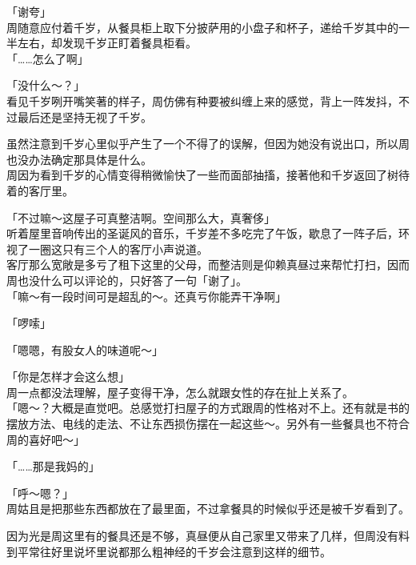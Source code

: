 「谢夸」\\

周随意应付着千岁，从餐具柜上取下分披萨用的小盘子和杯子，递给千岁其中的一半左右，却发现千岁正盯着餐具柜看。\\

「……怎么了啊」

「没什么～？」\\

看见千岁咧开嘴笑著的样子，周仿佛有种要被纠缠上来的感觉，背上一阵发抖，不过最后还是坚持无视了千岁。

虽然注意到千岁心里似乎产生了一个不得了的误解，但因为她没有说出口，所以周也没办法确定那具体是什么。\\

周因为看到千岁的心情变得稍微愉快了一些而面部抽搐，接著他和千岁返回了树待着的客厅里。\\

\vspace{2\baselineskip}

「不过嘛～这屋子可真整洁啊。空间那么大，真奢侈」\\

听着屋里音响传出的圣诞风的音乐，千岁差不多吃完了午饭，歇息了一阵子后，环视了一圈这只有三个人的客厅小声说道。\\

客厅那么宽敞是多亏了租下这里的父母，而整洁则是仰赖真昼过来帮忙打扫，因而周也没什么可以评论的，只好答了一句「谢了」。\\

「嘛～有一段时间可是超乱的～。还真亏你能弄干净啊」

「啰嗦」

「嗯嗯，有股女人的味道呢～」

「你是怎样才会这么想」\\

周一点都没法理解，屋子变得干净，怎么就跟女性的存在扯上关系了。\\

「嗯～？大概是直觉吧。总感觉打扫屋子的方式跟周的性格对不上。还有就是书的摆放方法、电线的走法、不让东西损伤摆在一起这些～。另外有一些餐具也不符合周的喜好吧～」

「……那是我妈的」

「呼～嗯？」\\

周姑且是把那些东西都放在了最里面，不过拿餐具的时候似乎还是被千岁看到了。

因为光是周这里有的餐具还是不够，真昼便从自己家里又带来了几样，但周没有料到平常往好里说坏里说都那么粗神经的千岁会注意到这样的细节。\\

